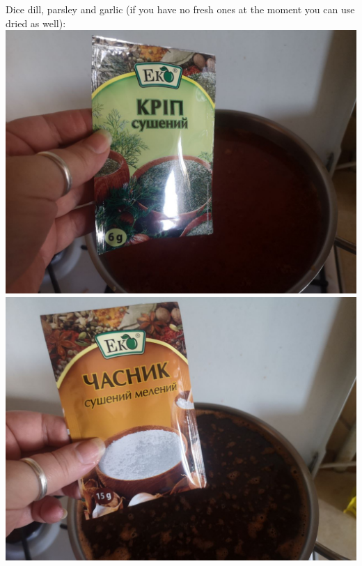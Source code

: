 \documentclass[11pt,a4paper]{article}
\begin{document}
Dice dill, parsley and garlic (if you have no fresh ones at the moment you can use dried as well): 
\includegraphics{16.jpg}
\includegraphics{17.jpg}
\end{document}
